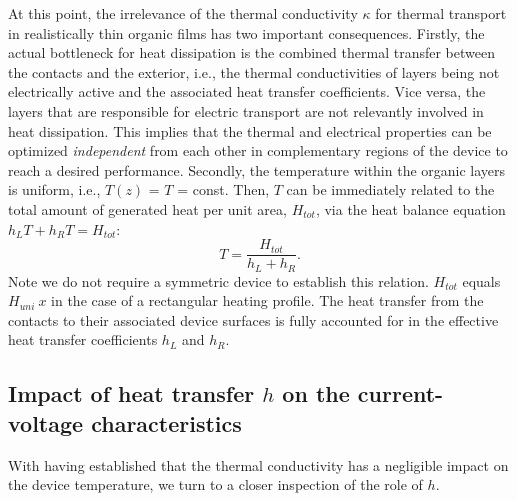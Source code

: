 \documentclass[%
9pt,
 aip,
rsi,%
 amsmath,amssymb,
preprint,%
]{revtex4-1}
\begin{document}
At this point, the irrelevance of the thermal conductivity $\kappa$ for thermal transport in realistically thin organic films has two important consequences.
Firstly, the actual bottleneck for heat dissipation is the combined thermal transfer between the contacts and the exterior, i.e., the thermal conductivities of layers being not electrically active and the associated heat transfer coefficients.
Vice versa, the layers that are responsible for electric transport are not relevantly involved in heat dissipation. 
This implies that the thermal and electrical properties can be optimized \textit{independent} from each other in complementary regions of the device to reach a desired performance. 
Secondly, the temperature within the organic layers is uniform, i.e., $T(z)$ = $T$ = const.
Then, $T$ can be immediately related to the total amount of generated heat per unit area, $H_{tot}$, via the heat balance equation $h_L T + h_R T = H_{tot}$:
%
\begin{equation}
	T=\frac{H_{tot}}{h_L+h_R}.
    \label{eq:onlyh}
\end{equation}
%
Note we do not require a symmetric device to establish this relation. 
$H_{tot}$ equals $H_{uni}~x$ in the case of a rectangular heating profile.
The heat transfer from the contacts to their associated device surfaces is fully accounted for in the effective heat transfer coefficients $h_L$ and $h_R$.  









\subsection{Impact of heat transfer $h$ on the current-voltage characteristics}
With having established that the thermal conductivity has a negligible impact on the device temperature, we turn to a closer inspection of the role of $h$.
\end{document}
